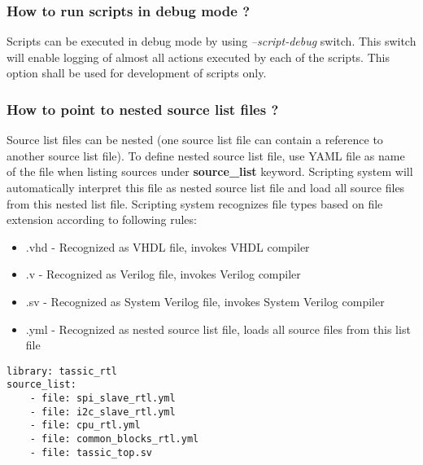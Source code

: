 \documentclass{tropic_design_spec}
\begin{document}
\subsubsection{How to run scripts in debug mode ?}
\label{sec:how-to-run-script-in-debug-mode}

Scripts can be executed in debug mode by using \textit{--script-debug} switch. This
switch will enable logging of almost all actions executed by each of the scripts.
This option shall be used for development of scripts only.


\subsubsection{How to point to nested source list files ?} 
\label{sec:how-to-point-to-nested-source-list-file}

Source list files can be nested (one source list file can contain a reference to
another source list file). To define nested source list file, use YAML file as
name of the file when listing sources under \textbf{source_list} keyword. Scripting
system will automatically interpret this file as nested source list file and load all
source files from this nested list file. Scripting system recognizes file types based
on file extension according to following rules:

\begin{itemize}
    \item{.vhd     - Recognized as VHDL file, invokes VHDL compiler}
    \item{.v       - Recognized as Verilog file, invokes Verilog compiler}
    \item{.sv      - Recognized as System Verilog file, invokes System Verilog compiler}
    \item{.yml     - Recognized as nested source list file, loads all source files
                     from this list file}
\end{itemize}

\begin{lstlisting}
library: tassic_rtl
source_list:
    - file: spi_slave_rtl.yml
    - file: i2c_slave_rtl.yml
    - file: cpu_rtl.yml
    - file: common_blocks_rtl.yml
    - file: tassic_top.sv
\end{lstlisting}
\end{document}
